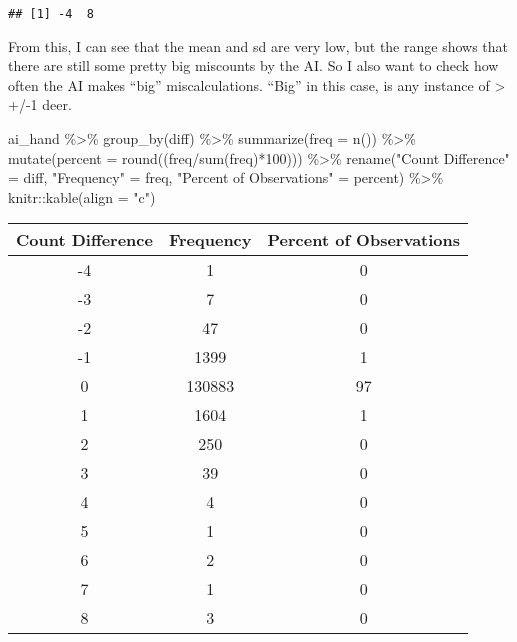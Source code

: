 \documentclass[
]{book}
\newenvironment{Shaded}{\begin{snugshade}}{\end{snugshade}}
\newcommand{\AttributeTok}[1]{\textcolor[rgb]{0.77,0.63,0.00}{#1}}
\newcommand{\DecValTok}[1]{\textcolor[rgb]{0.00,0.00,0.81}{#1}}
\newcommand{\FunctionTok}[1]{\textcolor[rgb]{0.00,0.00,0.00}{#1}}
\newcommand{\NormalTok}[1]{#1}
\newcommand{\OtherTok}[1]{\textcolor[rgb]{0.56,0.35,0.01}{#1}}
\newcommand{\SpecialCharTok}[1]{\textcolor[rgb]{0.00,0.00,0.00}{#1}}
\newcommand{\StringTok}[1]{\textcolor[rgb]{0.31,0.60,0.02}{#1}}
\begin{document}
\begin{verbatim}
## [1] -4  8
\end{verbatim}

From this, I can see that the mean and sd are very low, but the range shows that there are still some pretty big miscounts by the AI. So I also want to check how often the AI makes ``big'' miscalculations. ``Big'' in this case, is any instance of \textgreater{} +/-1 deer.

\begin{Shaded}
\begin{Highlighting}[]
\NormalTok{ai\_hand }\SpecialCharTok{\%\textgreater{}\%} 
  \FunctionTok{group\_by}\NormalTok{(diff) }\SpecialCharTok{\%\textgreater{}\%} 
  \FunctionTok{summarize}\NormalTok{(}\AttributeTok{freq =} \FunctionTok{n}\NormalTok{()) }\SpecialCharTok{\%\textgreater{}\%}
  \FunctionTok{mutate}\NormalTok{(}\AttributeTok{percent =} \FunctionTok{round}\NormalTok{((freq}\SpecialCharTok{/}\FunctionTok{sum}\NormalTok{(freq)}\SpecialCharTok{*}\DecValTok{100}\NormalTok{))) }\SpecialCharTok{\%\textgreater{}\%}
  \FunctionTok{rename}\NormalTok{(}\StringTok{"Count Difference"} \OtherTok{=}\NormalTok{ diff,}
         \StringTok{"Frequency"} \OtherTok{=}\NormalTok{ freq,}
         \StringTok{"Percent of Observations"} \OtherTok{=}\NormalTok{ percent) }\SpecialCharTok{\%\textgreater{}\%}
\NormalTok{  knitr}\SpecialCharTok{::}\FunctionTok{kable}\NormalTok{(}\AttributeTok{align =} \StringTok{"c"}\NormalTok{) }
\end{Highlighting}
\end{Shaded}

\begin{tabular}{c|c|c}
\hline
Count Difference & Frequency & Percent of Observations\\
\hline
-4 & 1 & 0\\
\hline
-3 & 7 & 0\\
\hline
-2 & 47 & 0\\
\hline
-1 & 1399 & 1\\
\hline
0 & 130883 & 97\\
\hline
1 & 1604 & 1\\
\hline
2 & 250 & 0\\
\hline
3 & 39 & 0\\
\hline
4 & 4 & 0\\
\hline
5 & 1 & 0\\
\hline
6 & 2 & 0\\
\hline
7 & 1 & 0\\
\hline
8 & 3 & 0\\
\hline
\end{tabular}
\end{document}

